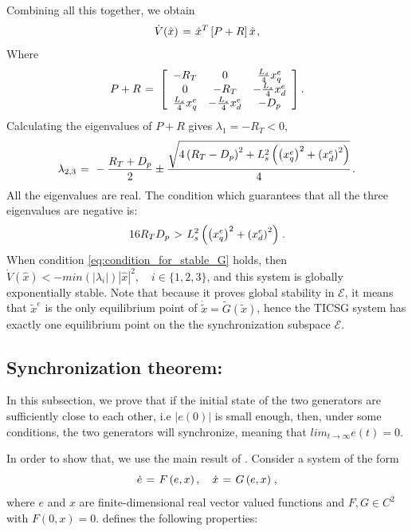 \documentclass[letterpaper, 10 pt, conference]{ieeeconf}
\renewcommand{\l}    {{\lambda}}
\newcommand{\m}      {{\hbox{\hskip 1pt}}}
\begin{document}
Combining all this together, we obtain 
$$\dot{V}(\hat{x}) \m=\m \hat{x}^{T}\left[P+R\right]\hat{x} \m,$$
Where 
$$ P+R \m=\m \left[\begin{array}{ccc} -R_T & 0 & \frac{L_s}{4}
   x_q^e\\ 0 & -R_T & -\frac{L_s}{4} x_d^e\\ \frac{L_s}{4} x_q^e 
   & -\frac{L_s}{4} x_d^e & -D_p \end{array}\right].$$
Calculating the eigenvalues of $P+R$ gives \m $\l_{1}=-R_T<0$,
$$ \l_{2,3} \m=\m -\frac{R_T+D_p}{2} \pm\frac{\sqrt{4\left(R_T-D_p
   \right)^2+L_s^2\left(\left(x_q^e\right)^2 + \left(x_d^e
   \right)^2\right)}}{4} \m.$$
All the eigenvalues are real. The condition which guarantees that
all the three eigenvalues are negative is:
\begin{equation} \label{eq:condition_for_stable_G}
   16 R_T D_p \m>\m L_s^2 \left( \left(x_q^e\right)^2+\left( x_d^e
   \right)^2\right) \m.
\end{equation}
When condition \eqref{eq:condition_for_stable_G} holds, then
$\dot{V}(\hat{x})<-min\left(\left|\lambda_{i}\right|\right)|
\hat{x}|^{2},\quad i\in\{1,2,3\}$, and this system is globally
exponentially stable. Note that because it proves global stability in
$\mathscr{E}$, it means that $\tilde{x}^{e}$ is the only equilibrium
point of $\dot{\tilde{x}}=\tilde{G}(\tilde{x})$, hence the TICSG
system has exactly one equilibrium point on the the synchronization
subspace $\mathscr{E}$.

\subsection{Synchronization theorem:}
 
In this subsection, we prove that if the initial state of the two generators
are sufficiently close to each other, i.e $|e(0)|$ is small enough, then, under some conditions, the two generators will synchronize, meaning that $lim_{t\to\infty}e(t)=0$.

In order to show that, we use the main result of 
\cite{AndrieuJayawardhanaPraly}. Consider a system of the form 
\begin{equation} \label{eq:systemForm}
   \dot{e} \m=\m F\left(e,x\right),\quad \dot{x} \m=\m
   G\left(e,x\right) \m,
\end{equation}
where $e$ and $x$ are finite-dimensional real vector valued functions
and $F, G \in C^2$ with $F(0,x)=0$. \cite{AndrieuJayawardhanaPraly}
defines the following properties:
\end{document}
